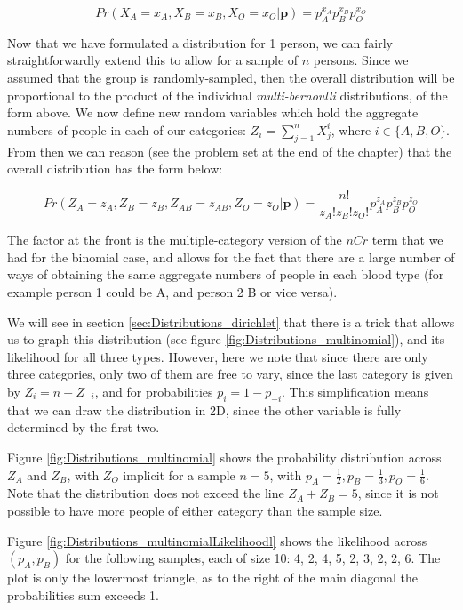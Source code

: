 \documentclass[11pt,fullpage]{book}
\begin{document}
\begin{equation}
Pr(X_A=x_A,X_B=x_B,X_O=x_O|\boldsymbol{p}) = p_A^{x_A} p_B^{x_B} p_O^{x_O}
\end{equation}

Now that we have formulated a distribution for 1 person, we can fairly straightforwardly extend this to allow for a sample of $n$ persons. Since we assumed that the group is randomly-sampled, then the overall distribution will be proportional to the product of the individual \textit{multi-bernoulli} distributions, of the form above. We now define new random variables which hold the aggregate numbers of people in each of our categories: $Z_i=\sum\limits_{j=1}^{n}X_j^i$, where $i\in\{A,B,O\}$. From then we can reason (see the problem set at the end of the chapter) that the overall distribution has the form below:



\begin{equation}
Pr(Z_A=z_A,Z_B=z_B,Z_{AB}=z_{AB},Z_{O}=z_O|\boldsymbol{p}) = \frac{n!}{z_A!z_B!z_O!} p_A^{z_A} p_B^{z_B}  p_O^{z_O}
\end{equation}

The factor at the front is the multiple-category version of the $nCr$ term that we had for the binomial case, and allows for the fact that there are a large number of ways of obtaining the same aggregate numbers of people in each blood type (for example person 1 could be A, and person 2 B or vice versa).

We will see in section \ref{sec:Distributions_dirichlet} that there is a trick that allows us to graph this distribution (see figure \ref{fig:Distributions_multinomial}), and its likelihood for all three types. However, here we note that since there are only three categories, only two of them are free to vary, since the last category is given by $Z_i = n - Z_{-i}$, and for probabilities $p_i = 1 - p_{-i}$. This simplification means that we can draw the distribution in 2D, since the other variable is fully determined by the first two.

Figure \ref{fig:Distributions_multinomial} shows the probability distribution across $Z_A$ and $Z_B$, with $Z_O$ implicit for a sample $n=5$, with $p_A=\frac{1}{2},p_B=\frac{1}{3},p_O=\frac{1}{6}$. Note that the distribution does not exceed the line $Z_A+Z_B=5$, since it is not possible to have more people of either category than the sample size.

Figure \ref{fig:Distributions_multinomialLikelihoodl} shows the likelihood across $(p_A,p_B)$ for the following samples, each of size 10: {{4, 2, 4}, {5, 2, 3}, {2, 2, 6}}. The plot is only the lowermost triangle, as to the right of the main diagonal the probabilities sum exceeds 1.
\end{document}
